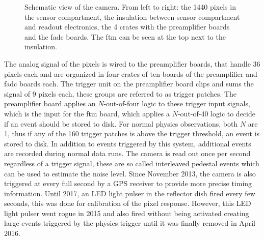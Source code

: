 \begin{figure}
  \begin{captionbeside}{
    Schematic view of the camera. From left to right: the 1440 pixels in the 
    sensor compartment, the insulation between sensor compartment and
    readout electronics, the 4 crates with the preamplifier boards and the 
    \gls{fadc} boards. The \gls{ftm} can be seen at the top next to the insulation.\\
  }
  \end{captionbeside}\label{fig:camera}
\end{figure}

The analog signal of the pixels is wired to the preamplifier boards, that handle
36 pixels each and are organized in four crates of ten boards of the preamplifier
and \gls{fadc} boards each.
The trigger unit on the preamplifier board clips and sums the signal of 9 pixels each,
these groups are referred to as trigger patches. 
The preamplifier board applies an $N$-out-of-four logic to these trigger input signals,
which is the input for the \gls{ftm} board, which applies a $N$-out-of-40 logic to
decide if an event should be stored to disk.
For normal physics observations, both $N$ are 1, thus if any of the 160 trigger patches
is above the trigger threshold, an event is stored to disk.
In addition to events triggered by this system, additional events are recorded
during normal data runs.
The camera is read out once per second regardless of a trigger signal, these
are so called interleaved pedestal events which can be used to estimate the noise
level.
Since November 2013, the camera is also triggered at every full second by a GPS
receiver to provide more precise timing information.
Until 2017, an LED light pulser in the reflector dish fired every few seconds,
this was done for calibration of the pixel response.
However, this LED light pulser went rogue in 2015 and also fired without being activated
creating large events triggered by the physics trigger until it was finally removed in April 2016.

